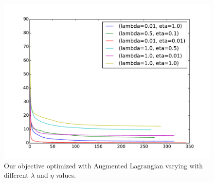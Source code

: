 \documentclass{article}
\newcommand{\0}{\mathrm{0}}
\newcommand{\1}{\mathrm{1}}
\begin{document}
\begin{figure}
  \includegraphics[width=\textwidth]{augmented-lagrangian/plots/objective.pdf}
  \caption{Our objective optimized with Augmented Lagrangian varying with different $\lambda$ and $\eta$ values.}
\end{figure}
\end{document}
